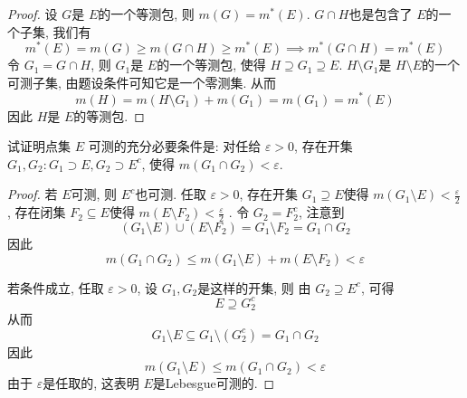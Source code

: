 \documentclass[../main.tex]{subfiles}
\begin{document}
\begin{proof}
    设 \(  G  \)是 \(  E  \)的一个等测包, 则 \(  m\left( G \right)= m^{*}\left( E \right)    \). \(  G\cap H  \)也是包含了 \(  E  \)的一个子集, 我们有 \[
   m^{*}\left( E \right)=   m\left( G \right)\ge m\left( G\cap H \right)\ge  m^{*}\left( E \right)  \implies m^{*}\left( G\cap H \right)= m^{*}\left( E \right)   
    \]   令 \(  G_1= G\cap H  \), 则 \(  G_1  \)是 \(  E  \)的一个等测包, 使得 \(  H\supseteq G_1\supseteq E  \). \(  H\setminus G_1  \)是 \(  H\setminus E  \)的一个可测子集, 由题设条件可知它是一个零测集. 从而 \[
    m\left( H \right)= m\left( H\setminus G_1 \right)+ m\left( G_1 \right)= m\left( G_1 \right)= m^{*}\left( E \right)     
    \]因此 \(  H  \)是 \(  E  \)的等测包.        
\end{proof}
\begin{exercise}{}{}
试证明点集 $E$ 可测的充分必要条件是: 对任给 $\varepsilon > 0$, 存在开集 $G_1, G_2: G_1 \supset E, G_2 \supset E^c$, 使得 $m(G_1 \cap G_2) < \varepsilon$.
\end{exercise}
\begin{proof}
    若 \(  E  \)可测, 则 \(  E^{c}  \)也可测. 任取 \(   \varepsilon > 0  \),  存在开集 \(  G_1\supseteq E  \)使得 \(  m\left( G_1\setminus E \right)< \frac{ \varepsilon  }{2 }    \), 存在闭集 \(  F_2\subseteq E  \)使得 \(  m\left( E\setminus F_2 \right)< \frac{ \varepsilon }{2 }    \) . 令 \(  G_2= F_2^{c}  \), 注意到   \[
    \left( G_1\setminus E \right) \cup \left( E\setminus F_2 \right) = G_1\setminus F_2= G_1\cap G_2
    \]  因此 \[
    m\left( G_1\cap G_2 \right)\le m\left( G_1\setminus E \right)+ m\left( E\setminus F_2 \right)<  \varepsilon    
    \]  

    若条件成立,  任取 \(   \varepsilon > 0  \), 设 \(  G_1,G_2  \)是这样的开集, 则 由 \(  G_2\supseteq E^{c}  \), 可得 \[
    E\supseteq G_2^{c}
    \]  从而\[
    G_1\setminus E\subseteq G_1\setminus \left( G_2^{c} \right)= G_1\cap G_2 
    \]因此 \[
    m\left( G_1\setminus E \right)\le m\left( G_1\cap G_2 \right)<  \varepsilon   
    \]由于 \(   \varepsilon   \)是任取的, 这表明 \(  E  \)是Lebesgue可测的.  
\end{proof}
\end{document}

